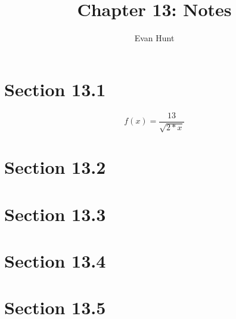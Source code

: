 \documentclass[12pt]{article}
\title{Chapter 13: Notes}
\author{Evan Hunt}
\begin{document}
    \maketitle

    \section[]{Section 13.1}
        \begin{equation}
            f(x) = \frac{13}{\sqrt{2*x}}
        \end{equation}
    \section[]{Section 13.2}
    \section[]{Section 13.3}
    \section[]{Section 13.4}
    \section[]{Section 13.5}
\end{document}
